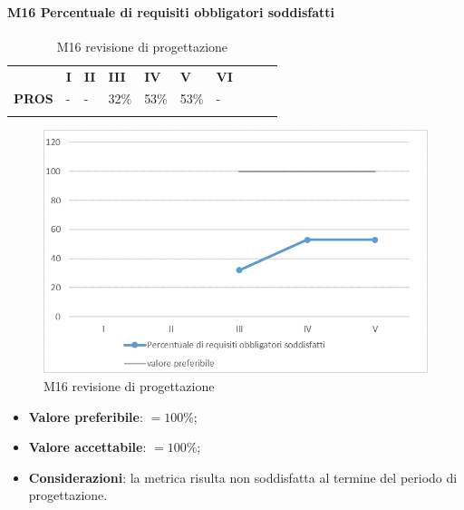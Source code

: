 \paragraph{M16 Percentuale di requisiti obbligatori soddisfatti} \mbox{}
\begin{longtable}[H!] {						
		>{}p{50mm}  		
		>{}p{8mm}
		>{}p{8mm}		
		>{}p{8mm}		
		>{}p{8mm}		
		>{}p{8mm}		
		>{}p{8mm}
		>{}p{8mm}
		>{}p{8mm}
		>{}p{8mm}
	}
	\rowcolor{gray!50}
	\textbf{} & \textbf{I} & \textbf{II} & \textbf{III} & \textbf{IV} & \textbf{V} & \textbf{VI} \TBstrut \\ [2mm]
	\textbf{PROS} & - & - & 32\% & 53\% & 53\% & - \TBstrut \\ [2mm]
	\rowcolor{white}
	\caption{M16 revisione di progettazione}
\end{longtable}
\begin{figure}[H] 	
\includegraphics[width=\linewidth]{./img/grafici/RP13.png}	
\caption{M16 revisione di progettazione}	
\end{figure}
\begin{itemize}
	\item \textbf{Valore preferibile}: $=100\%$;
	\item \textbf{Valore accettabile}: $=100\%$;
	\item \textbf{Considerazioni}: la metrica risulta non soddisfatta al termine del periodo di progettazione.
\end{itemize}
